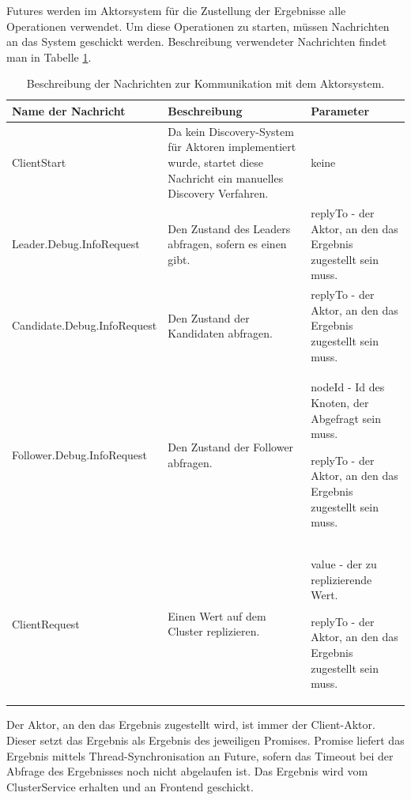 Futures werden im Aktorsystem für die Zustellung der Ergebnisse alle Operationen verwendet. Um diese Operationen zu starten, müssen Nachrichten an das System geschickt werden. Beschreibung verwendeter Nachrichten findet man in Tabelle \ref{tab:operations}.

\begin{table} \centering
	\begin{tabular}{|p{4.9cm}|p{4.25cm}|p{4.25cm}|} 
		\hline
		\textbf{Name der Nachricht} & \textbf{Beschreibung} & \textbf{Parameter} \\
		
		\hline
		ClientStart & Da kein Discovery-System für Aktoren implementiert wurde, startet diese Nachricht ein manuelles Discovery Verfahren. & keine\\

		\hline
		Leader.Debug.InfoRequest & Den Zustand des Leaders abfragen, sofern es einen gibt. & replyTo - der Aktor, an den das Ergebnis zugestellt sein muss.\\
		
		\hline
		Candidate.Debug.InfoRequest & Den Zustand der Kandidaten abfragen. & replyTo - der Aktor, an den das Ergebnis zugestellt sein muss.\\
		
		\hline
		Follower.Debug.InfoRequest & Den Zustand der Follower abfragen. & nodeId - Id des Knoten, der Abgefragt sein muss.
		
		replyTo - der Aktor, an den das Ergebnis zugestellt sein muss.\\
		
		\hline
		ClientRequest & Einen Wert auf dem Cluster replizieren. & value - der zu replizierende Wert.
		
		replyTo - der Aktor, an den das Ergebnis zugestellt sein muss.\\
				
		\hline
	\end{tabular}
	\caption{Beschreibung der Nachrichten zur Kommunikation mit dem Aktorsystem.}
	\label{tab:operations}
\end{table}

Der Aktor, an den das Ergebnis zugestellt wird, ist immer der Client-Aktor. Dieser setzt das Ergebnis als Ergebnis des jeweiligen Promises. Promise liefert das Ergebnis mittels Thread-Synchronisation an Future, sofern das Timeout bei der Abfrage des Ergebnisses noch nicht abgelaufen ist. Das Ergebnis wird vom ClusterService erhalten und an Frontend geschickt.

